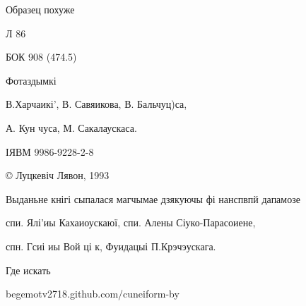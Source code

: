 \documentclass{beamer}
\begin{document}
\begin{frame}{Образец похуже}

Л 86 

БОК 908 (474.5)

Фотаздымкі

В.Харчаикі', В. Савяикова, В. Бальчуц)са,

А. Кун чуса, М. Сакалаускаса.

ІЯВМ 9986-9228-2-8

© Луцкевіч Лявон, 1993

Выданьне кнігі сыпалася магчымае дзякуючы фі нанспвпй дапамозе

спи. Ялі'иы Кахаиоускаюї, спи. Алены Сіуко-Парасоиене,

спн. Гсиі иы Вой ці к, Фуидацыі П.Крэчэускага.
\end{frame}


\begin{frame}{Где искать}
\begin{center}
begemotv2718.github.com/cuneiform-by
\end{center}
\end{frame}
\end{document}
